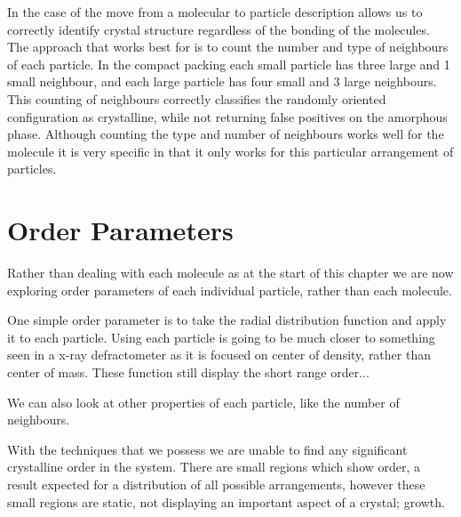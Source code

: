 In the case of \scon the move from a molecular to particle description allows us to correctly identify crystal structure regardless of the bonding of the molecules. The approach that works best for \sone is to count the number and type of neighbours of each particle. In the compact packing each small particle has three large and 1 small neighbour, and each large particle has four small and 3 large neighbours. This counting of neighbours correctly classifies the randomly oriented configuration as crystalline, while not returning false positives on the amorphous phase. Although counting the type and number of neighbours works well for the \sone molecule it is very specific in that it only works for this particular arrangement of particles. 


\section{Order Parameters}


Rather than dealing with each molecule as at the start of this chapter we are now exploring order parameters of each individual particle, rather than each molecule.

One simple order parameter is to take the radial distribution function and apply it to each particle. Using each particle is going to be much closer to something seen in a x-ray defractometer as it is focused on center of density, rather than center of mass. These function still display the short range order...


We can also look at other properties of each particle, like the number of neighbours.

With the techniques that we possess we are unable to find any significant crystalline order in the system. There are small regions which show order, a result expected for a distribution of all possible arrangements, however these small regions are static, not displaying an important aspect of a crystal; growth.



